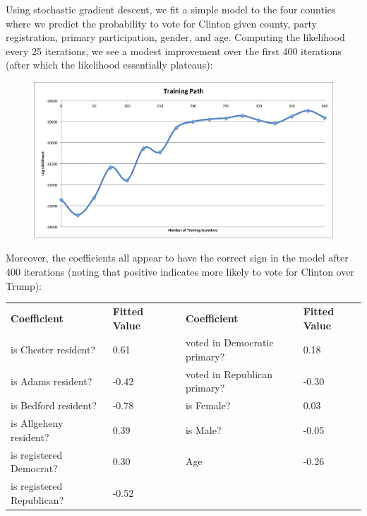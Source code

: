 \documentclass{article}
\begin{document}
Using stochastic gradient descent, we fit a simple model to the four counties where we predict the probability to vote for Clinton given county, party registration, primary participation, gender, and age. Computing the likelihood every 25 iterations, we see a modest improvement over the first 400 iterations (after which the likelihood essentially plateaus): 
\begin{figure}[H]
\centering
\includegraphics[scale = 0.6]{TrainingPath}
\end{figure}

Moreover, the coefficients all appear to have the correct sign in the model after 400 iterations (noting that positive indicates more likely to vote for Clinton over Trump): 

\begin{table}[H]
\centering
\label{my-label}
\begin{tabular}{|l|l|l|l|l|}
\cline{1-2} \cline{4-5}
\textbf{Coefficient}      & \textbf{Fitted Value} &  & \textbf{Coefficient}         & \textbf{Fitted Value} \\ \cline{1-2} \cline{4-5} 
is Chester resident?      & 0.61                  &  & voted in Democratic primary? & 0.18                  \\ \cline{1-2} \cline{4-5} 
is Adams resident?        & -0.42                 &  & voted in Republican primary? & -0.30                 \\ \cline{1-2} \cline{4-5} 
is Bedford resident?      & -0.78                 &  & is Female?                   & 0.03                  \\ \cline{1-2} \cline{4-5} 
is Allgeheny resident?    & 0.39                  &  & is Male?                     & -0.05                 \\ \cline{1-2} \cline{4-5} 
is registered Democrat?   & 0.30                  &  & Age                          & -0.26                 \\ \cline{1-2} \cline{4-5} 
is registered Republican? & -0.52                 &  &                              &                       \\ \cline{1-2} \cline{4-5} 
\end{tabular}
\end{table}
\end{document}
